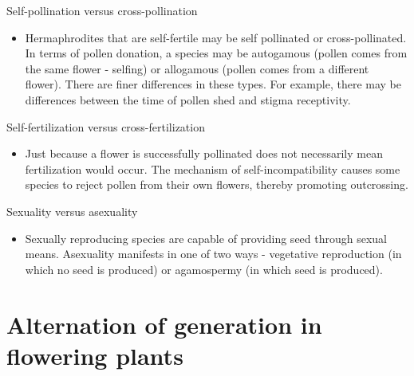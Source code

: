 \documentclass[11pt,ignorenonframetext,aspectratio=169]{beamer}
\providecommand{\tightlist}{%
  \setlength{\itemsep}{0pt}\setlength{\parskip}{0pt}}
\begin{document}
\begin{frame}{Self-pollination versus cross-pollination}
\protect\hypertarget{self-pollination-versus-cross-pollination}{}
\begin{itemize}
\tightlist
\item
  Hermaphrodites that are self-fertile may be self pollinated or
  cross-pollinated. In terms of pollen donation, a species may be
  autogamous (pollen comes from the same flower - selfing) or allogamous
  (pollen comes from a different flower). There are finer differences in
  these types. For example, there may be differences between the time of
  pollen shed and stigma receptivity.
\end{itemize}
\end{frame}

\begin{frame}{Self-fertilization versus cross-fertilization}
\protect\hypertarget{self-fertilization-versus-cross-fertilization}{}
\begin{itemize}
\tightlist
\item
  Just because a flower is successfully pollinated does not necessarily
  mean fertilization would occur. The mechanism of self-incompatibility
  causes some species to reject pollen from their own flowers, thereby
  promoting outcrossing.
\end{itemize}
\end{frame}

\begin{frame}{Sexuality versus asexuality}
\protect\hypertarget{sexuality-versus-asexuality}{}
\begin{itemize}
\tightlist
\item
  Sexually reproducing species are capable of providing seed through
  sexual means. Asexuality manifests in one of two ways - vegetative
  reproduction (in which no seed is produced) or agamospermy (in which
  seed is produced).
\end{itemize}
\end{frame}

\hypertarget{alternation-of-generation-in-flowering-plants}{%
\section{Alternation of generation in flowering
plants}\label{alternation-of-generation-in-flowering-plants}}
\end{document}
